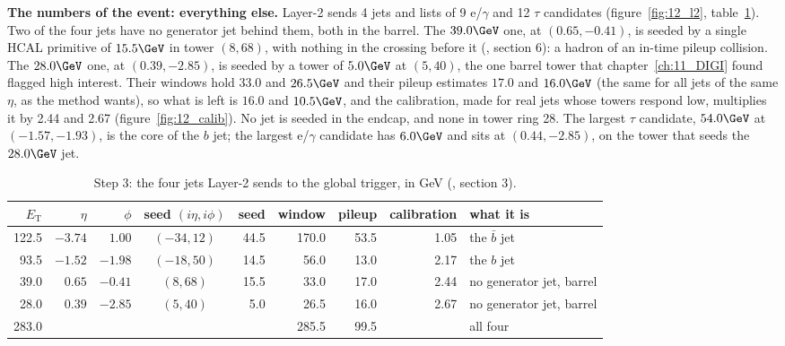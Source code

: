 \textbf{The numbers of the event: everything else.} Layer-2 sends 4 jets and lists of 9 e/$\gamma$ and 12 $\tau$
candidates (figure~\ref{fig:12_l2}, table~\ref{tab:12_alljets}). Two of the four jets have no generator jet behind
them, both in the barrel. The $39.0\GeV$ one, at $(0.65,-0.41)$, is seeded by a single HCAL primitive of $15.5\GeV$ in
tower $(8,68)$, with nothing in the crossing before it (, section 6): a hadron of an in-time
pileup collision. The $28.0\GeV$ one, at $(0.39,-2.85)$, is seeded by a tower of $5.0\GeV$ at $(5,40)$, the one barrel
tower that chapter~\ref{ch:11_DIGI} found flagged high interest. Their windows hold $33.0$ and $26.5\GeV$ and their
pileup estimates $17.0$ and $16.0\GeV$ (the same for all jets of the same $\eta$, as the method wants), so what is left
is $16.0$ and $10.5\GeV$, and the calibration, made for real jets whose towers respond low, multiplies it by 2.44 and
2.67 (figure~\ref{fig:12_calib}). No jet is seeded in the endcap, and none in tower ring 28. The largest $\tau$
candidate, $54.0\GeV$ at $(-1.57,-1.93)$, is the core of the $b$ jet; the largest e/$\gamma$ candidate has $6.0\GeV$ and
sits at $(0.44,-2.85)$, on the tower that seeds the $28.0\GeV$ jet.

\begin{table}[!htb]
\centering\small
\caption{Step 3: the four jets Layer-2 sends to the global trigger, in GeV (, section 3).}
\label{tab:12_alljets}
\begin{tabular}{rrr c rrrr l}
\toprule
$E_{\mathrm T}$ & $\eta$ & $\phi$ & seed $(i\eta,i\phi)$ & seed & window & pileup & calibration & what it is \\
\midrule
122.5 & $-3.74$ & $1.00$ & $(-34,12)$ & 44.5 & 170.0 & 53.5 & 1.05 & the $\bar b$ jet \\
93.5 & $-1.52$ & $-1.98$ & $(-18,50)$ & 14.5 & 56.0 & 13.0 & 2.17 & the $b$ jet \\
39.0 & $0.65$ & $-0.41$ & $(8,68)$ & 15.5 & 33.0 & 17.0 & 2.44 & no generator jet, barrel \\
28.0 & $0.39$ & $-2.85$ & $(5,40)$ & 5.0 & 26.5 & 16.0 & 2.67 & no generator jet, barrel \\
\midrule
283.0 & & & & & 285.5 & 99.5 & & all four \\
\bottomrule
\end{tabular}
\end{table}

